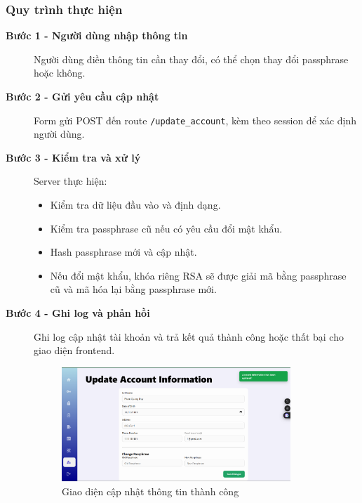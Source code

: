 \subsubsection*{Quy trình thực hiện}
\begin{description}

    \item[\textbf{Bước 1 - Người dùng nhập thông tin}]
    Người dùng điền thông tin cần thay đổi, có thể chọn thay đổi passphrase hoặc không.

    \item[\textbf{Bước 2 - Gửi yêu cầu cập nhật}]
    Form gửi POST đến route \texttt{/update\_account}, kèm theo session để xác định người dùng.

    \item[\textbf{Bước 3 - Kiểm tra và xử lý}]
    Server thực hiện:
    \begin{itemize}
        \item Kiểm tra dữ liệu đầu vào và định dạng.
        \item Kiểm tra passphrase cũ nếu có yêu cầu đổi mật khẩu.
        \item Hash passphrase mới và cập nhật.
        \item Nếu đổi mật khẩu, khóa riêng RSA sẽ được giải mã bằng passphrase cũ và mã hóa lại bằng passphrase mới.
    \end{itemize}

    \item[\textbf{Bước 4 - Ghi log và phản hồi}]
    Ghi log cập nhật tài khoản và trả kết quả thành công hoặc thất bại cho giao diện frontend.

    \begin{figure}[H]
        \centering
        \includegraphics[width=0.85\textwidth]{img/5_update/5_update_success.png}
        \caption{Giao diện cập nhật thông tin thành công}
    \end{figure}
\end{description}


